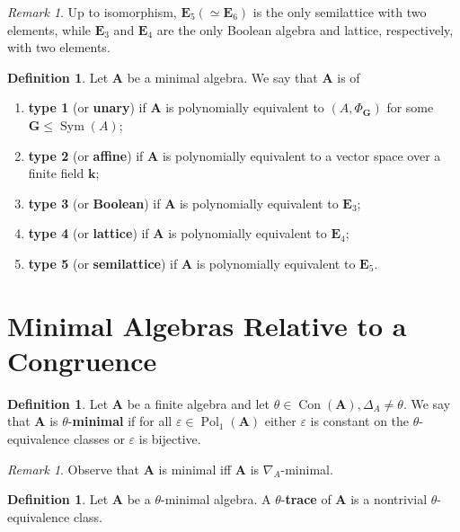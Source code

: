 \documentclass{amsart}
\theoremstyle{plain}
\theoremstyle{definition}
\newtheorem{definition}[theorem]{Definition}
\theoremstyle{remark}
\newtheorem{remark}[theorem]{Remark}
\def\epsilon{\varepsilon}
\DeclareMathOperator{\Con}{Con}
\DeclareMathOperator{\Pol}{Pol}
\DeclareMathOperator{\Sym}{Sym}
\DeclareMathOperator{\M}{M}
\begin{document}
\begin{remark}
    Up to isomorphism, $\mathbf{E}_5 (\simeq \mathbf{E}_6)$ is the only semilattice with two elements, while $\mathbf{E}_3$ and $\mathbf{E}_4$ are the only Boolean algebra and lattice, respectively, with two elements. 
\end{remark}

\begin{definition}
    \label{defn_type}
    Let $\mathbf{A}$ be a minimal algebra. 
    We say that $\mathbf{A}$ is of 
    \begin{enumerate}
        \item \textbf{type 1} (or \textbf{unary}) if $\mathbf{A}$ is polynomially equivalent to $(A, \Phi_\mathbf{G})$ for some $\mathbf{G} \le \Sym(A)$; 
        \item \textbf{type 2} (or \textbf{affine}) if $\mathbf{A}$ is polynomially equivalent to a vector space over a finite field $\mathbf{k}$; 
        \item \textbf{type 3} (or \textbf{Boolean}) if $\mathbf{A}$ is polynomially equivalent to $\mathbf{E}_3$;
        \item \textbf{type 4} (or \textbf{lattice}) if $\mathbf{A}$ is polynomially equivalent to $\mathbf{E}_4$;
        \item \textbf{type 5} (or \textbf{semilattice}) if $\mathbf{A}$ is polynomially equivalent to $\mathbf{E}_5$. 
    \end{enumerate}
\end{definition}

\section{Minimal Algebras Relative to a Congruence}
\begin{definition}
    Let $\mathbf{A}$ be a finite algebra and let $ \theta \in \Con(\mathbf{A}), \Delta_A \neq \theta$. 
    We say that $\mathbf{A}$ is $\theta$-\textbf{minimal} if for all $\epsilon \in \Pol_1(\mathbf{A})$ either $\epsilon$ is constant on the $\theta$-equivalence classes or $\epsilon$ is bijective. 
\end{definition}

\begin{remark}
    Observe that $\mathbf{A}$ is minimal iff $\mathbf{A}$ is $\nabla_A$-minimal. 
\end{remark}

\begin{definition}
    Let $\mathbf{A}$ be a $\theta$-minimal algebra. 
    A $\theta$-\textbf{trace} of $\mathbf{A}$ is 
    a nontrivial $\theta$-equivalence class.  
\end{definition}
\end{document}
